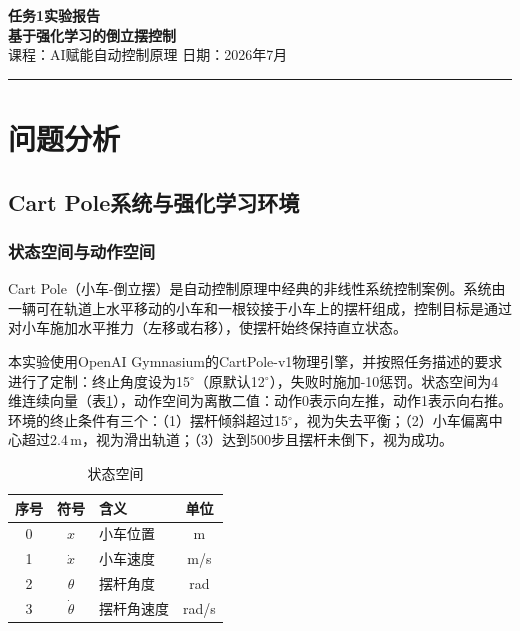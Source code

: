 \documentclass[12pt,a4paper]{ctexart}
\begin{document}
\begin{center}
    {\LARGE \textbf{任务1实验报告}}\\[0.3cm]
    {\Large \textbf{基于强化学习的倒立摆控制}}\\[1cm]
    {\large 课程：AI赋能自动控制原理 \quad 日期：2026年7月}\\[0.8cm]
    \rule{\textwidth}{0.4pt}
\end{center}

\section{问题分析}

\subsection{Cart Pole系统与强化学习环境}

\subsubsection{状态空间与动作空间}

Cart Pole（小车-倒立摆）是自动控制原理中经典的非线性系统控制案例。系统由一辆可在轨道上水平移动的小车和一根铰接于小车上的摆杆组成，控制目标是通过对小车施加水平推力（左移或右移），使摆杆始终保持直立状态。

本实验使用OpenAI Gymnasium的CartPole-v1物理引擎，并按照任务描述的要求进行了定制：终止角度设为15$^\circ$（原默认12$^\circ$），失败时施加-10惩罚。状态空间为4维连续向量（表\ref{tab:state}），动作空间为离散二值：动作0表示向左推，动作1表示向右推。环境的终止条件有三个：（1）摆杆倾斜超过15$^\circ$，视为失去平衡；（2）小车偏离中心超过2.4\,m，视为滑出轨道；（3）达到500步且摆杆未倒下，视为成功。

\begin{table}[H]
\centering
\caption{状态空间}
\label{tab:state}
\begin{tabular}{cclc}
\toprule
\textbf{序号} & \textbf{符号} & \textbf{含义} & \textbf{单位} \\
\midrule
0 & \(x\) & 小车位置 & m \\
1 & \(\dot{x}\) & 小车速度 & m/s \\
2 & \(\theta\) & 摆杆角度 & rad \\
3 & \(\dot{\theta}\) & 摆杆角速度 & rad/s \\
\bottomrule
\end{tabular}
\end{table}
\end{document}
